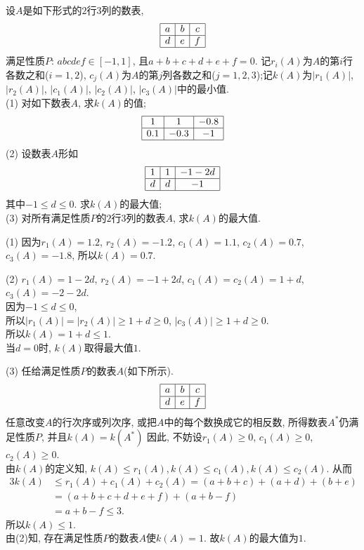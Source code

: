 \documentclass[green]{lsbook}
\begin{document}
\begin{tcolorbox}[applelight,title={2012.文20(本小题13分)}]
	设$A$是如下形式的$2$行$3$列的数表,
	  	$$\begin{array}{|c|c|c|}
 	\hline
 	 		a & b &c\\
 	 		\hline
 	 		d&e&f\\
 	 		\hline
 	 	\end{array}$$
满足性质$P$: $abcdef$$\in [-1,1]$, 且$a+b+c+d+e+f=0$. 
记${{r}_{i}}(A)$为$A$的第$i$行各数之和($i=1, 2$), $c_j(A)$为$A$的第$j$列各数之和($j=1, 2, 3$);记$k(A)$为$|r_1(A)|$, $|r_2(A)|$, $|c_1(A)|$, $|c_2(A)|$, $|c_3(A)|$中的最小值. \\
(1) 对如下数表$A$, 求$k(A)$的值;
 	$$\begin{array}{|c|c|c|}
 	\hline
 	 		1 & 1 &-0.8\\
 	 		\hline
 	 		0.1&-0.3&-1\\
 	 		\hline
 	 	\end{array}$$
(2) 设数表$A$形如
 	$$\begin{array}{|c|c|c|}
 	\hline
 	 		1 & 1 &-1-2d\\
 	 		\hline
 	 		d&d&-1\\
 	 		\hline
 	 	\end{array}$$
其中$-1\leq d\leq 0$. 求$k(A)$的最大值;\\
(3) 对所有满足性质$P$的$2$行$3$列的数表$A$, 求$k(A)$的最大值. 
\end{tcolorbox}


(1) 因为$r_1(A)=1.2$, $r_2(A)=-1.2$, $c_1(A)=1.1$, $c_2(A)=0.7$, $c_3(A)=-1.8$, 
所以$k(A)=0.7$. 

(2) $r_1(A)=1-2d$, $r_2(A)=-1+2d$, $c_1(A)=c_2(A)=1+d$, $c_3(A)=-2-2d$.\\
因为$-1\leq d\leq 0$, \\
所以$|r_1(A)|=|r_2(A)|\geq 1+d\geq 0$, $|c_3(A)|\geq 1+d\geq 0$.\\
所以$k(A)=1+d\leq 1$. \\
当$d=0$时, $k(A)$取得最大值$1$. 

(3) 任给满足性质$P$的数表$A$(如下所示). 
	$$\begin{array}{|c|c|c|}
 	\hline
 	 		a & b &c\\
 	 		\hline
 	 		d&e&f\\
 	 		\hline
 	 	\end{array}$$
任意改变$A$的行次序或列次序, 或把$A$中的每个数换成它的相反数, 所得数表$A^*$仍满足性质$P$, 并且$k(A)=k(A^*)$
因此, 不妨设$r_1(A)\geq 0$, $c_1(A)\geq 0$, $c_2(A)\geq 0$.\\ 
由$k(A)$的定义知, $k(A)\leq r_1(A), k(A)\leq c_1(A), k(A)\leq c_2(A)$. 从而
\begin{align*}
3k(A)&\leq r_1(A)+c_1(A)+c_2(A)=(a+b+c)+(a+d)+(b+e)\\
&=(a+b+c+d+e+f)+(a+b-f)\\
&=a+b-f\leq 3.
\end{align*}
所以$k(A)\leq 1$.\\ 
由(2)知, 存在满足性质$P$的数表$A$使$k(A)=1$. 故$k(A)$的最大值为$1$. 
\newpage
\end{document}
